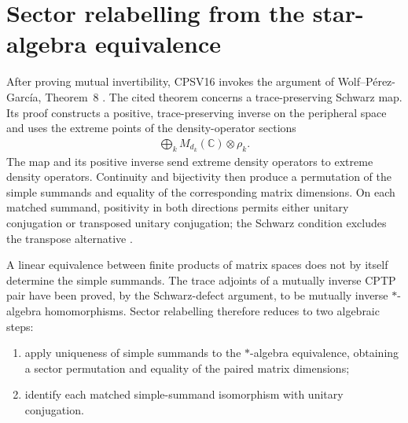 \documentclass{article}
\begin{document}
\section{Sector relabelling from the star-algebra equivalence}

After proving mutual invertibility, CPSV16 invokes the argument of
Wolf--P\'erez-Garc\'ia, Theorem~8
\cite[Appendix~C.4, lines~1995--2003]{Cirac2016MPDO_arXiv}. The cited theorem
concerns a trace-preserving Schwarz map. Its proof constructs a positive,
trace-preserving inverse on the peripheral space and uses the extreme points
of the density-operator sections
\begin{align}
    \bigoplus_k M_{d_k}(\mathbb C)\otimes\rho_k.
    \label{eq:cpsv16_vertical_sector_invertibility_density_operator_sections}
\end{align}
The map and its positive inverse send extreme density operators to extreme
density operators. Continuity and bijectivity then produce a permutation of
the simple summands and equality of the corresponding matrix dimensions. On
each matched summand, positivity in both directions permits either unitary
conjugation or transposed unitary conjugation; the Schwarz condition excludes
the transpose alternative
\cite[Theorem~8 and its proof]{WolfPerezGarcia2010Inverse}.

A linear equivalence between finite products of matrix spaces does not by
itself determine the simple summands. The trace adjoints of a mutually inverse
CPTP pair have been proved, by the Schwarz-defect argument, to be mutually
inverse $*$-algebra homomorphisms. Sector relabelling therefore reduces to two
algebraic steps:
\begin{enumerate}
    \item apply uniqueness of simple summands to the $*$-algebra equivalence,
          obtaining a sector permutation and equality of the paired matrix
          dimensions;
    \item identify each matched simple-summand isomorphism with unitary
          conjugation.
\end{enumerate}
\end{document}
